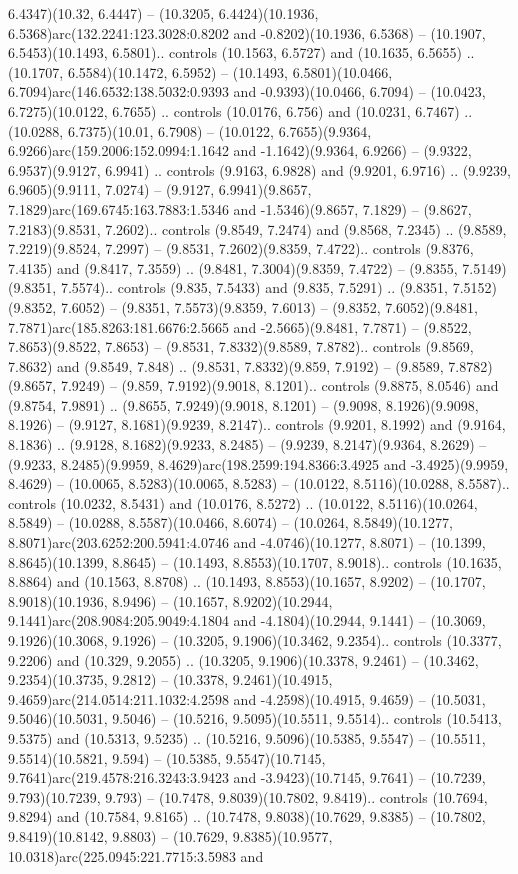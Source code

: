 6.4347)(10.32, 6.4447) -- (10.3205, 6.4424)(10.1936, 6.5368)arc(132.2241:123.3028:0.8202 and -0.8202)(10.1936, 6.5368) -- (10.1907, 6.5453)(10.1493, 6.5801).. controls (10.1563, 6.5727) and (10.1635, 6.5655) .. (10.1707, 6.5584)(10.1472, 6.5952) -- (10.1493, 6.5801)(10.0466, 6.7094)arc(146.6532:138.5032:0.9393 and -0.9393)(10.0466, 6.7094) -- (10.0423, 6.7275)(10.0122, 6.7655) .. controls (10.0176, 6.756) and (10.0231, 6.7467) .. (10.0288, 6.7375)(10.01, 6.7908) -- (10.0122, 6.7655)(9.9364, 6.9266)arc(159.2006:152.0994:1.1642 and -1.1642)(9.9364, 6.9266) -- (9.9322, 6.9537)(9.9127, 6.9941) .. controls (9.9163, 6.9828) and (9.9201, 6.9716) .. (9.9239, 6.9605)(9.9111, 7.0274) -- (9.9127, 6.9941)(9.8657, 7.1829)arc(169.6745:163.7883:1.5346 and -1.5346)(9.8657, 7.1829) -- (9.8627, 7.2183)(9.8531, 7.2602).. controls (9.8549, 7.2474) and (9.8568, 7.2345) .. (9.8589, 7.2219)(9.8524, 7.2997) -- (9.8531, 7.2602)(9.8359, 7.4722).. controls (9.8376, 7.4135) and (9.8417, 7.3559) .. (9.8481, 7.3004)(9.8359, 7.4722) -- (9.8355, 7.5149)(9.8351, 7.5574).. controls (9.835, 7.5433) and (9.835, 7.5291) .. (9.8351, 7.5152)(9.8352, 7.6052) -- (9.8351, 7.5573)(9.8359, 7.6013) -- (9.8352, 7.6052)(9.8481, 7.7871)arc(185.8263:181.6676:2.5665 and -2.5665)(9.8481, 7.7871) -- (9.8522, 7.8653)(9.8522, 7.8653) -- (9.8531, 7.8332)(9.8589, 7.8782).. controls (9.8569, 7.8632) and (9.8549, 7.848) .. (9.8531, 7.8332)(9.859, 7.9192) -- (9.8589, 7.8782)(9.8657, 7.9249) -- (9.859, 7.9192)(9.9018, 8.1201).. controls (9.8875, 8.0546) and (9.8754, 7.9891) .. (9.8655, 7.9249)(9.9018, 8.1201) -- (9.9098, 8.1926)(9.9098, 8.1926) -- (9.9127, 8.1681)(9.9239, 8.2147).. controls (9.9201, 8.1992) and (9.9164, 8.1836) .. (9.9128, 8.1682)(9.9233, 8.2485) -- (9.9239, 8.2147)(9.9364, 8.2629) -- (9.9233, 8.2485)(9.9959, 8.4629)arc(198.2599:194.8366:3.4925 and -3.4925)(9.9959, 8.4629) -- (10.0065, 8.5283)(10.0065, 8.5283) -- (10.0122, 8.5116)(10.0288, 8.5587).. controls (10.0232, 8.5431) and (10.0176, 8.5272) .. (10.0122, 8.5116)(10.0264, 8.5849) -- (10.0288, 8.5587)(10.0466, 8.6074) -- (10.0264, 8.5849)(10.1277, 8.8071)arc(203.6252:200.5941:4.0746 and -4.0746)(10.1277, 8.8071) -- (10.1399, 8.8645)(10.1399, 8.8645) -- (10.1493, 8.8553)(10.1707, 8.9018).. controls (10.1635, 8.8864) and (10.1563, 8.8708) .. (10.1493, 8.8553)(10.1657, 8.9202) -- (10.1707, 8.9018)(10.1936, 8.9496) -- (10.1657, 8.9202)(10.2944, 9.1441)arc(208.9084:205.9049:4.1804 and -4.1804)(10.2944, 9.1441) -- (10.3069, 9.1926)(10.3068, 9.1926) -- (10.3205, 9.1906)(10.3462, 9.2354).. controls (10.3377, 9.2206) and (10.329, 9.2055) .. (10.3205, 9.1906)(10.3378, 9.2461) -- (10.3462, 9.2354)(10.3735, 9.2812) -- (10.3378, 9.2461)(10.4915, 9.4659)arc(214.0514:211.1032:4.2598 and -4.2598)(10.4915, 9.4659) -- (10.5031, 9.5046)(10.5031, 9.5046) -- (10.5216, 9.5095)(10.5511, 9.5514).. controls (10.5413, 9.5375) and (10.5313, 9.5235) .. (10.5216, 9.5096)(10.5385, 9.5547) -- (10.5511, 9.5514)(10.5821, 9.594) -- (10.5385, 9.5547)(10.7145, 9.7641)arc(219.4578:216.3243:3.9423 and -3.9423)(10.7145, 9.7641) -- (10.7239, 9.793)(10.7239, 9.793) -- (10.7478, 9.8039)(10.7802, 9.8419).. controls (10.7694, 9.8294) and (10.7584, 9.8165) .. (10.7478, 9.8038)(10.7629, 9.8385) -- (10.7802, 9.8419)(10.8142, 9.8803) -- (10.7629, 9.8385)(10.9577, 10.0318)arc(225.0945:221.7715:3.5983 and 